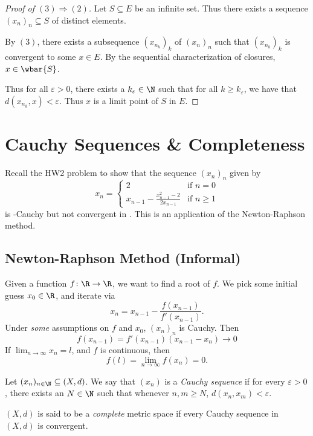 \begin{proof}[Proof of $(3) \Rightarrow (2)$]
    Let $S \subseteq E$ be an infinite set.
    Thus there exists a sequence $(x_n)_n \subseteq S$ of distinct elements.

    By $(3)$, there exists a subsequence $(x_{n_k})_k$ of $(x_n)_n$
    such that $(x_{n_k})_k$ is convergent to some $x \in E$.
    By the sequential characterization of closures, $x \in \wbar{S}$.

    Thus for all $\varepsilon > 0$, there exists a $k_\varepsilon \in \N$
    such that for all $k \ge k_\varepsilon$, we have that
    $d(x_{n_k}, x) < \varepsilon$.
    Thus $x$ is a limit point of $S$ in $E$.
\end{proof}

\section{Cauchy Sequences \& Completeness} \label{sec:cauchy}
Recall the HW2 problem to show that the sequence $(x_n)_n$ given by \[
    x_n = \begin{cases}
        2 & \text{if } n = 0 \\
        x_{n-1} - \frac{x_{n-1}^2 - 2}{2x_{n-1}} & \text{if } n \ge 1
    \end{cases}
\] is \Q-Cauchy but not convergent in \Q.
This is an application of the Newton-Raphson method.
\subsection{Newton-Raphson Method (Informal)}
\label{sec:newton-raphson_method}
Given a function $f\colon \R \to \R$, we want to find a root of $f$.
We pick some initial guess $x_0 \in \R$, and iterate via \[
    x_n = x_{n-1} - \frac{f(x_{n-1})}{f'(x_{n-1})}.
\] Under \emph{some} assumptions on $f$ and $x_0$, $(x_n)_n$ is Cauchy.
Then \[
    f(x_{n-1}) = f'(x_{n-1})(x_{n-1} - x_n) \to 0
\] If $\lim_{n \to \infty} x_n = l$, and $f$ is continuous, then \[
    f(l) = \lim_{n \to \infty} f(x_n) = 0.
\]
\begin{definition} \label{def:cauchy:sequence}
    Let $(x_n)_{n \in \N} \subseteq (X, d)$.
    We say that $(x_n)$ is a \emph{Cauchy sequence} if for every
    $\varepsilon > 0$, there exists an $N \in \N$ such that whenever
    $n, m \ge N$, $d(x_n, x_m) < \varepsilon$.
\end{definition}
\begin{definition}[Completeness] \label{def:cauchy:completeness}
    $(X, d)$ is said to be a \emph{complete} metric space if every Cauchy
    sequence in $(X, d)$ is convergent.
\end{definition}

